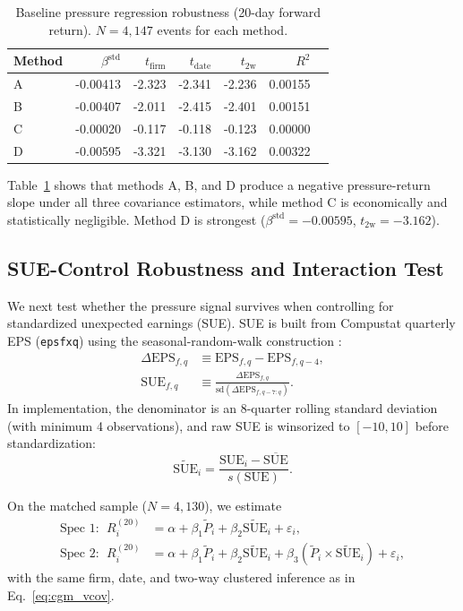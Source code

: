 \begin{table}[!t]
\centering
\caption{Baseline pressure regression robustness (20-day forward return).
$N=4{,}147$ events for each method.}
\label{tab:robust_baseline}
\begin{tabular}{lrrrrrr}
\hline
Method & $\beta^{\text{std}}$ & $t_{\text{firm}}$ & $t_{\text{date}}$ & $t_{2\mathrm{w}}$ & $R^2$ \\
\hline
A & -0.00413 & -2.323 & -2.341 & -2.236 & 0.00155 \\
B & -0.00407 & -2.011 & -2.415 & -2.401 & 0.00151 \\
C & -0.00020 & -0.117 & -0.118 & -0.123 & 0.00000 \\
D & -0.00595 & -3.321 & -3.130 & -3.162 & 0.00322 \\
\hline
\end{tabular}
\end{table}

Table~\ref{tab:robust_baseline} shows that methods A, B, and D produce a
negative pressure-return slope under all three covariance estimators, while
method C is economically and statistically negligible. Method D is strongest
($\beta^{\text{std}}=-0.00595$, $t_{2\mathrm{w}}=-3.162$).

\subsection{SUE-Control Robustness and Interaction Test}

We next test whether the pressure signal survives when controlling for
standardized unexpected earnings (SUE). SUE is built from Compustat quarterly
EPS (\texttt{epsfxq}) using the seasonal-random-walk construction
\citep{BernardThomas1989}:
\begin{align}
\Delta \mathrm{EPS}_{f,q} &\equiv \mathrm{EPS}_{f,q}-\mathrm{EPS}_{f,q-4},\\
\mathrm{SUE}_{f,q} &\equiv
\frac{\Delta \mathrm{EPS}_{f,q}}{\mathrm{sd}\!\left(\Delta \mathrm{EPS}_{f,q-7:q}\right)}.
\end{align}
In implementation, the denominator is an 8-quarter rolling standard deviation
(with minimum 4 observations), and raw SUE is winsorized to $[-10,10]$ before
standardization:
\begin{equation}
\widetilde{\mathrm{SUE}}_i
=\frac{\mathrm{SUE}_i-\overline{\mathrm{SUE}}}{s(\mathrm{SUE})}.
\end{equation}

On the matched sample ($N=4{,}130$), we estimate
\begin{align}
\text{Spec 1: }\;
R^{(20)}_i
&= \alpha + \beta_1\widetilde P_i + \beta_2\widetilde{\mathrm{SUE}}_i + \varepsilon_i,
\label{eq:sue_spec1}\\
\text{Spec 2: }\;
R^{(20)}_i
&= \alpha + \beta_1\widetilde P_i + \beta_2\widetilde{\mathrm{SUE}}_i
+ \beta_3\left(\widetilde P_i\times\widetilde{\mathrm{SUE}}_i\right) + \varepsilon_i,
\label{eq:sue_spec2}
\end{align}
with the same firm, date, and two-way clustered inference as in
Eq.~\eqref{eq:cgm_vcov}.

